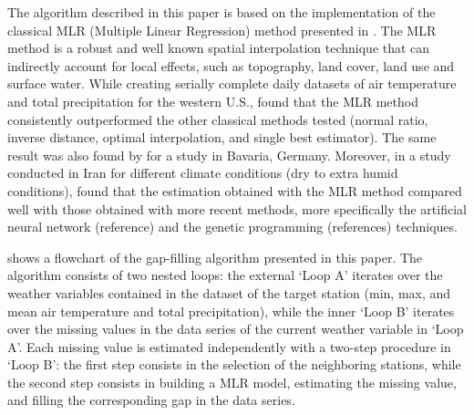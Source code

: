 \documentclass[TechnicalNoteMeteo.tex]{subfiles}
\begin{document}
The algorithm described in this paper is based on the implementation of the classical MLR (Multiple Linear Regression) method presented in \cite{eischeid_creating_2000}. The MLR method is a robust and well known spatial interpolation technique that can indirectly account for local effects, such as topography, land cover, land use and surface water. While creating serially complete daily datasets of air temperature and total precipitation for the western U.S., \cite{eischeid_creating_2000} found that the MLR method consistently outperformed the other classical methods tested (normal ratio, inverse distance, optimal interpolation, and single best estimator). The same result was also found by \cite{xia_forest_1999} for a study in Bavaria, Germany. Moreover, in a study conducted in Iran for different climate conditions (dry to extra humid conditions), \cite{kashani_evaluation_2011} found that the estimation obtained with the MLR method compared well with those obtained with more recent methods, more specifically the artificial neural network (reference) and the genetic programming (references) techniques.

 shows a flowchart of the gap-filling algorithm presented in this paper. The algorithm consists of two nested loops: the external `Loop A' iterates over the weather variables contained in the dataset of the target station (min, max, and mean air temperature and total precipitation), while the inner `Loop B' iterates over the missing values in the data series of the current weather variable in `Loop A'. Each missing value is estimated independently with a two-step procedure in `Loop B': the first step consists in the selection of the neighboring stations, while the second step consists in building a MLR model, estimating the missing value, and filling the corresponding gap in the data series. %
\end{document}

